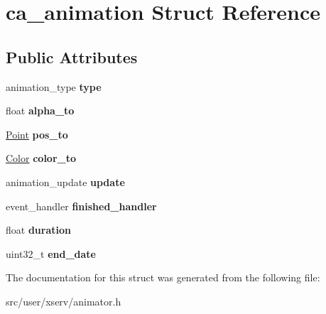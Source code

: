 \hypertarget{structca__animation}{}\section{ca\+\_\+animation Struct Reference}
\label{structca__animation}
\subsection*{Public Attributes}
\begin{DoxyCompactItemize}
\item 
\mbox{\label{structca__animation_a916969655df7064e4d075b6e6f5c1eb7}} 
animation\+\_\+type {\bfseries type}
\item 
\mbox{\label{structca__animation_a39c2e3f830b2528b04f8c20d2a9fa0cf}} 
float {\bfseries alpha\+\_\+to}
\item 
\mbox{\label{structca__animation_aa00f53db27c59aedf8fe3244fcef5f37}} 
\hyperlink{structcoordinate}{Point} {\bfseries pos\+\_\+to}
\item 
\mbox{\label{structca__animation_a7cd5ebe7595c18c5d5e32241a5a5fd29}} 
\hyperlink{structcolor}{Color} {\bfseries color\+\_\+to}
\item 
\mbox{\label{structca__animation_aca35d0c8b0190d160756de11223ffc4e}} 
animation\+\_\+update {\bfseries update}
\item 
\mbox{\label{structca__animation_a953c21d16b6c18b794f3ed6c756f5525}} 
event\+\_\+handler {\bfseries finished\+\_\+handler}
\item 
\mbox{\label{structca__animation_a75e89e9202688e387c23d19b2505be16}} 
float {\bfseries duration}
\item 
\mbox{\label{structca__animation_a749402f27ac0809609e4c0205177a961}} 
uint32\+\_\+t {\bfseries end\+\_\+date}
\end{DoxyCompactItemize}


The documentation for this struct was generated from the following file\+:\begin{DoxyCompactItemize}
\item 
src/user/xserv/animator.\+h\end{DoxyCompactItemize}
